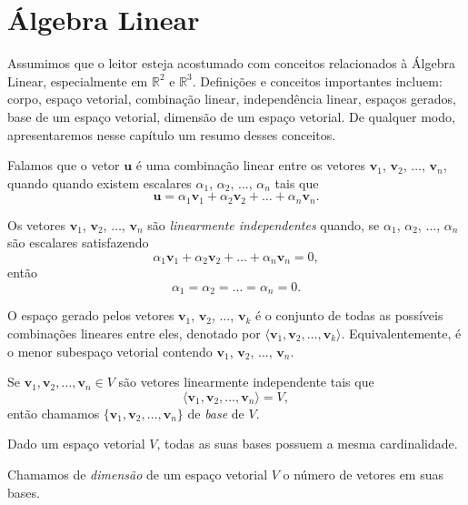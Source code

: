 \chapter{Álgebra Linear}

Assumimos que o leitor esteja acostumado com conceitos relacionados à Álgebra Linear, especialmente em \(\mathbb{R}^2\) e \(\mathbb{R}^3\).
Definições e conceitos importantes incluem:
corpo, espaço vetorial, combinação linear, independência linear, espaços gerados, base de um espaço vetorial, dimensão de um espaço vetorial.
De qualquer modo, apresentaremos nesse capítulo um resumo desses conceitos.

\begin{defn}
    Falamos que o vetor \(\mathbf u\) é uma combinação linear entre os vetores \(\mathbf v_1\), \(\mathbf v_2\), \(\dots\), \(\mathbf v_n\), quando quando existem escalares \(\alpha_1\), \(\alpha_2\), \(\dots\), \(\alpha_n\) tais que
    \begin{equation}
        \mathbf u = \alpha_1\mathbf v_1 + \alpha_2\mathbf v_2 + \dots + \alpha_n\mathbf v_n.
    \end{equation}
\end{defn}

\begin{defn}
    Os vetores \(\mathbf v_1\), \(\mathbf v_2\), \(\dots\), \(\mathbf v_n\) são \emph{linearmente independentes} quando, se \(\alpha_1\), \(\alpha_2\), \(\dots\), \(\alpha_n\) são escalares satisfazendo
    \begin{equation}
        \alpha_1\mathbf v_1 + \alpha_2\mathbf v_2 +\dots + \alpha_n\mathbf v_n = 0,
    \end{equation}
    então
    \begin{equation}
        \alpha_1 = \alpha_2 = \dots = \alpha_n = 0.
    \end{equation}
\end{defn}

\begin{defn}
    O espaço gerado pelos vetores \(\mathbf v_1\), \(\mathbf v_2\), \(\dots\), \(\mathbf v_k\) é o conjunto de todas as possíveis combinações lineares entre eles, denotado por \(\langle\mathbf v_1,\mathbf v_2,\dots,\mathbf v_k\rangle\).
    Equivalentemente, é o menor subespaço vetorial contendo \(\mathbf v_1\), \(\mathbf v_2\), \(\dots\), \(\mathbf v_n\).
\end{defn}

\begin{defn}
    Se \(\mathbf v_1, \mathbf v_2, \dots, \mathbf v_n \in V\) são vetores linearmente independente tais que
    \begin{equation}
        \langle \mathbf v_1, \mathbf v_2, \dots, \mathbf v_n \rangle = V,
    \end{equation}
    então chamamos \(\{\mathbf v_1, \mathbf v_2, \dots, \mathbf v_n\}\) de \emph{base} de \(V\).
\end{defn}

\begin{thm}
    Dado um espaço vetorial \(V\), todas as suas bases possuem a mesma cardinalidade.
\end{thm}

\begin{defn}
    Chamamos de \emph{dimensão} de um espaço vetorial \(V\) o número de vetores em suas bases.
\end{defn}
